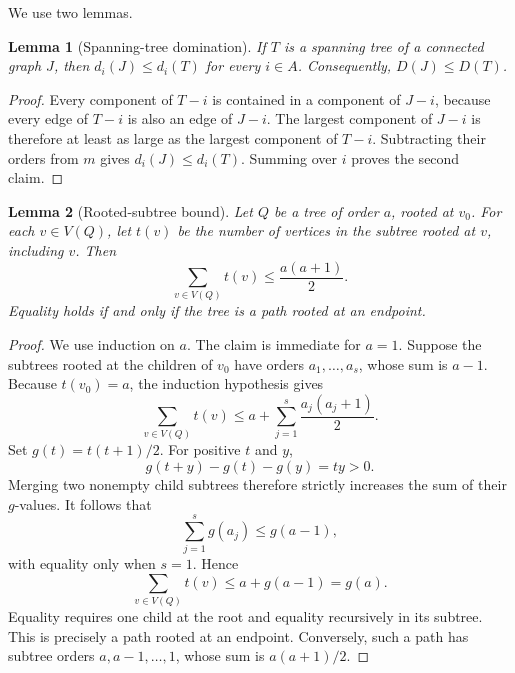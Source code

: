 \documentclass[preprint,12pt,authoryear]{elsarticle}
\newtheorem{lemma}{Lemma}
\begin{document}
We use two lemmas.

\begin{lemma}[Spanning-tree domination]
\label{lem:spanning}
If \(T\) is a spanning tree of a connected graph \(J\), then
\(d_i(J)\leq d_i(T)\) for every \(i\in A\). Consequently,
\(D(J)\leq D(T)\).
\end{lemma}

\begin{proof}
Every component of \(T-i\) is contained in a component of \(J-i\), because
every edge of \(T-i\) is also an edge of \(J-i\). The largest component of
\(J-i\) is therefore at least as large as the largest component of \(T-i\).
Subtracting their orders from \(m\) gives \(d_i(J)\leq d_i(T)\). Summing over
\(i\) proves the second claim.
\end{proof}

\begin{lemma}[Rooted-subtree bound]
\label{lem:branch}
Let \(Q\) be a tree of order \(a\), rooted at \(v_0\). For each
\(v\in V(Q)\), let \(t(v)\) be the number of vertices in the subtree rooted at
\(v\), including \(v\). Then
\[
 \sum_{v\in V(Q)}t(v)\leq\frac{a(a+1)}2.
\]
Equality holds if and only if the tree is a path rooted at an endpoint.
\end{lemma}

\begin{proof}
We use induction on \(a\). The claim is immediate for \(a=1\). Suppose the
subtrees rooted at the children of \(v_0\) have orders
\(a_1,\ldots,a_s\), whose sum is \(a-1\). Because \(t(v_0)=a\), the induction
hypothesis gives
\[
 \sum_{v\in V(Q)}t(v)
 \leq a+\sum_{j=1}^s\frac{a_j(a_j+1)}2.
\]
Set \(g(t)=t(t+1)/2\). For positive \(t\) and \(y\),
\[
 g(t+y)-g(t)-g(y)=ty>0.
\]
Merging two nonempty child subtrees therefore strictly increases the sum of
their \(g\)-values. It follows that
\[
 \sum_{j=1}^s g(a_j)\leq g(a-1),
\]
with equality only when \(s=1\). Hence
\[
 \sum_{v\in V(Q)}t(v)\leq a+g(a-1)=g(a).
\]
Equality requires one child at the root and equality recursively in its
subtree. This is precisely a path rooted at an endpoint. Conversely, such a
path has subtree orders \(a,a-1,\ldots,1\), whose sum is \(a(a+1)/2\).
\end{proof}
\end{document}
